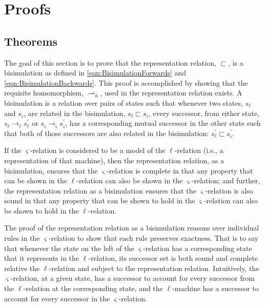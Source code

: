\section{Proofs}




\subsection{Theorems}

The goal of this section is to prove that the representation relation,
$\sqsubset$, is a bisimulation as defined in
\eqref{eqn:BisimulationForwards} and
\eqref{eqn:BisimulationBackwards}. This proof is accomplished by
showing that the requisite homomorphism, $\rightharpoonup_h$, used in
the representation relation exists. A bisimulation is a relation over
pairs of states such that whenever two states, $s_\ell$ and
$s_\varsigma$, are related in the bisimulation, $s_\ell \sqsubset
s_\varsigma$, every successor, from either state, $s_\ell
\rightarrow_\ell s_\ell^\prime$ or $s_\varsigma \rightarrow_\varsigma
s_\varsigma^\prime$, has a corresponding mutual successor in the other
state such that both of those successors are also related in the
bisimulation: $s_\ell^\prime \sqsubset s_\varsigma^\prime$.

If the $\varsigma$-relation is considered to be a model of the
$\ell$-relation (i.e., a representation of that machine), then the
representation relation, as a bisimulation, ensures that the
$\varsigma$-relation is complete in that any property that can be
shown in the $\ell$-relation can also be shown in the
$\varsigma$-relation; and further, the representation relation as a
bisimulation ensures that the $\varsigma$-relation is also sound in
that any property that can be shown to hold in the $\varsigma$-relation
can also be shown to hold in the $\ell$-relation.

The proof of the representation relation as a bisimulation reasons
over individual rules in the $\varsigma$-relation to show that each
rule preserves exactness. That is to say that whenever the state on
the left of the $\varsigma$-relation has a corresponding state that it
represents in the $\ell$-relation, its successor set is both sound and
complete relative the $\ell$-relation and subject to the
representation relation. Intuitively, the $\varsigma$-relation, at a
given state, has a successor to account for every successor from the
$\ell$-relation at the corresponding state, and the $\ell$-machine has
a successor to account for every successor in the
$\varsigma$-relation. 

